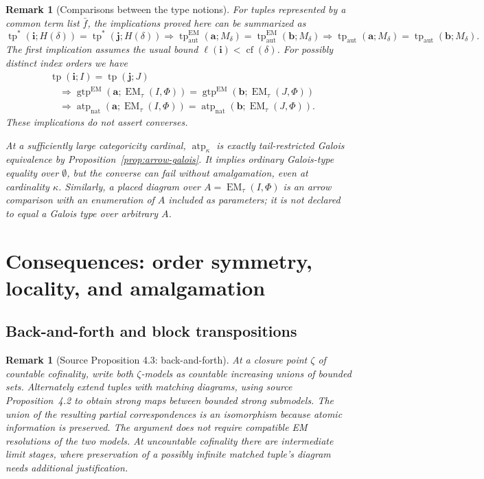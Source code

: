 \documentclass[11pt]{article}
\newcommand{\atp}{\operatorname{atp}}
\newcommand{\natatp}{\operatorname{atp}_{\mathrm{nat}}}
\newcommand{\gtp}{\operatorname{gtp}}
\newcommand{\auttp}{\operatorname{tp}_{\mathrm{aut}}}
\newcommand{\EMauttp}{\operatorname{tp}^{\mathrm{EM}}_{\mathrm{aut}}}
\newcommand{\tpstar}{\operatorname{tp}^{*}}
\newcommand{\EM}{\operatorname{EM}_{\tau}}
\newcommand{\ba}{\mathbf{a}}
\newcommand{\bb}{\mathbf{b}}
\newcommand{\bi}{\mathbf{i}}
\newcommand{\bj}{\mathbf{j}}
\theoremstyle{plain}
\newtheorem{remark}[definition]{Remark}
\begin{document}
\begin{remark}[Comparisons between the type notions]
For tuples represented by a common term list $\bar f$,
the implications proved here can be summarized as
\[
\tpstar(\bi;H(\delta))=\tpstar(\bj;H(\delta))
\Longrightarrow
\EMauttp(\ba;M_\delta)=\EMauttp(\bb;M_\delta)
\Longrightarrow
\auttp(\ba;M_\delta)=\auttp(\bb;M_\delta).
\]
The first implication assumes the usual bound
$\ell(\bi)<\operatorname{cf}(\delta)$.
For possibly distinct index orders we have
\[
\begin{aligned}
&\operatorname{tp}(\bi;I)=\operatorname{tp}(\bj;J)\\
&\quad\Longrightarrow
\gtp^{\mathrm{EM}}(\ba;\EM(I,\Phi))
=\gtp^{\mathrm{EM}}(\bb;\EM(J,\Phi))\\
&\quad\Longrightarrow
\natatp(\ba;\EM(I,\Phi))
=\natatp(\bb;\EM(J,\Phi)).
\end{aligned}
\]
These implications do not assert converses.

At a sufficiently large categoricity cardinal,
$\atp_\kappa$ is exactly tail-restricted Galois
equivalence by Proposition~\ref{prop:arrow-galois}.
It implies ordinary Galois-type equality over
$\emptyset$, but the converse can fail without
amalgamation, even at cardinality $\kappa$.
Similarly, a placed diagram
over $A=\EM(I,\Phi)$ is an arrow comparison with an
enumeration of $A$ included as parameters; it is not
declared to equal a Galois type over arbitrary $A$.
\end{remark}

\section{Consequences: order symmetry, locality, and amalgamation}
\subsection{Back-and-forth and block transpositions}
\begin{remark}[Source Proposition 4.3: back-and-forth]
At a closure point $\zeta$ of countable cofinality, write both
$\zeta$-models as countable increasing unions of bounded sets.
Alternately extend tuples with matching diagrams, using source
Proposition~4.2 to obtain strong maps between bounded strong
submodels. The union of the resulting partial correspondences
is an isomorphism because atomic information is preserved.
The argument does not require compatible EM resolutions of
the two models. At uncountable cofinality there are intermediate
limit stages, where preservation of a possibly infinite matched
tuple's diagram needs additional justification.
\end{remark}
\end{document}
